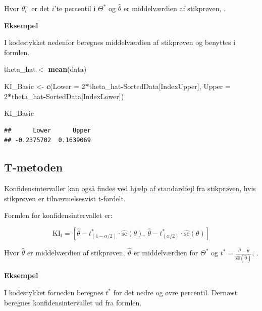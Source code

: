 \documentclass[
]{book}
\newenvironment{Shaded}{\begin{snugshade}}{\end{snugshade}}
\newcommand{\DataTypeTok}[1]{\textcolor[rgb]{0.13,0.29,0.53}{#1}}
\newcommand{\DecValTok}[1]{\textcolor[rgb]{0.00,0.00,0.81}{#1}}
\newcommand{\KeywordTok}[1]{\textcolor[rgb]{0.13,0.29,0.53}{\textbf{#1}}}
\newcommand{\NormalTok}[1]{#1}
\newcommand{\OperatorTok}[1]{\textcolor[rgb]{0.81,0.36,0.00}{\textbf{#1}}}
\newcommand{\StringTok}[1]{\textcolor[rgb]{0.31,0.60,0.02}{#1}}
\theoremstyle{definition}
\theoremstyle{definition}
\theoremstyle{definition}
\theoremstyle{remark}
\begin{document}
Hvor \(\theta^{\sim}_i\) er det \(i\)'te percentil i \(\Theta^*\) og \(\hat\theta\) er middelværdien af stikprøven, \citep{BasicKI}.

\textbf{Eksempel}

I kodestykket nedenfor beregnes middelværdien af stikprøven og benyttes i formlen.

\begin{Shaded}
\begin{Highlighting}[]
\NormalTok{theta_hat <-}\StringTok{ }\KeywordTok{mean}\NormalTok{(data)}

\NormalTok{KI_Basic <-}\StringTok{ }\KeywordTok{c}\NormalTok{(}\DataTypeTok{Lower =} \DecValTok{2}\OperatorTok{*}\NormalTok{theta_hat}\OperatorTok{-}\NormalTok{SortedData[IndexUpper],}
              \DataTypeTok{Upper =} \DecValTok{2}\OperatorTok{*}\NormalTok{theta_hat}\OperatorTok{-}\NormalTok{SortedData[IndexLower])}

\NormalTok{KI_Basic}
\end{Highlighting}
\end{Shaded}

\begin{verbatim}
##      Lower      Upper
## -0.2375702  0.1639069
\end{verbatim}

\hypertarget{t-metoden}{%
\subsection{T-metoden}\label{t-metoden}}

Konfidensintervaller kan også findes ved hjælp af standardfejl fra stikprøven, hvis stikprøven er tilnærmelsesvist t-fordelt.

Formlen for konfidensintervallet er:

\[\text{KI}_t=\left[\hat\theta-t^{*}_{(1-\alpha/2)}\cdot \hat{\text{se}}(\theta),~\hat\theta-t^{*}_{(\alpha/2)}\cdot\hat{\text{se}}(\theta)\right]\]

Hvor \(\hat\theta\) er middelværdien af stikprøven, \(\hat{\vartheta}\) er middelværdien for \(\Theta^*\) og \(t^{*}=\frac{\hat{\vartheta}-\hat\theta}{\hat{\text{se}}(\hat\vartheta)}\), \citep{TPKI}.

\textbf{Eksempel}

I kodestykket forneden beregnes \(t^{*}\) for det nedre og øvre percentil. Dernæst beregnes konfidensintervallet ud fra formlen.
\end{document}
